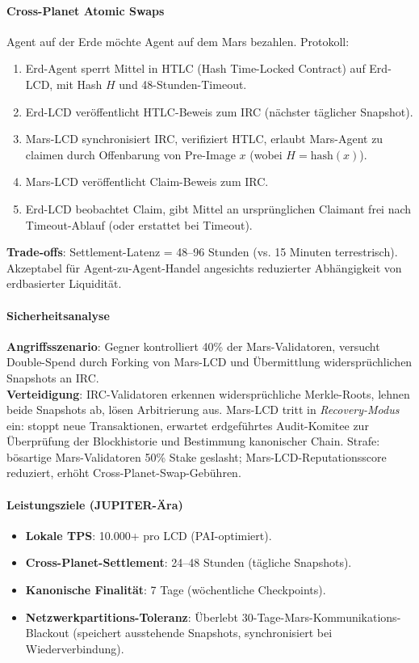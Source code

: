 \documentclass[11pt]{article}
\begin{document}
\paragraph{Cross-Planet Atomic Swaps}
Agent auf der Erde möchte Agent auf dem Mars bezahlen. Protokoll:
\begin{enumerate}[noitemsep]
  \item Erd-Agent sperrt Mittel in HTLC (Hash Time-Locked Contract) auf Erd-LCD, mit Hash $H$ und 48-Stunden-Timeout.
  \item Erd-LCD veröffentlicht HTLC-Beweis zum IRC (nächster täglicher Snapshot).
  \item Mars-LCD synchronisiert IRC, verifiziert HTLC, erlaubt Mars-Agent zu claimen durch Offenbarung von Pre-Image $x$ (wobei $H = \text{hash}(x)$).
  \item Mars-LCD veröffentlicht Claim-Beweis zum IRC.
  \item Erd-LCD beobachtet Claim, gibt Mittel an ursprünglichen Claimant frei nach Timeout-Ablauf (oder erstattet bei Timeout).
\end{enumerate}
\textbf{Trade-offs}: Settlement-Latenz = 48--96 Stunden (vs. 15 Minuten terrestrisch). Akzeptabel für Agent-zu-Agent-Handel angesichts reduzierter Abhängigkeit von erdbasierter Liquidität.

\paragraph{Sicherheitsanalyse}
\textbf{Angriffsszenario}: Gegner kontrolliert 40\% der Mars-Validatoren, versucht Double-Spend durch Forking von Mars-LCD und Übermittlung widersprüchlichen Snapshots an IRC.\\
\textbf{Verteidigung}: IRC-Validatoren erkennen widersprüchliche Merkle-Roots, lehnen beide Snapshots ab, lösen Arbitrierung aus. Mars-LCD tritt in \emph{Recovery-Modus} ein: stoppt neue Transaktionen, erwartet erdgeführtes Audit-Komitee zur Überprüfung der Blockhistorie und Bestimmung kanonischer Chain. Strafe: bösartige Mars-Validatoren 50\% Stake geslasht; Mars-LCD-Reputationsscore reduziert, erhöht Cross-Planet-Swap-Gebühren.

\paragraph{Leistungsziele (JUPITER-Ära)}
\begin{itemize}[noitemsep]
  \item \textbf{Lokale TPS}: 10.000+ pro LCD (PAI-optimiert).
  \item \textbf{Cross-Planet-Settlement}: 24--48 Stunden (tägliche Snapshots).
  \item \textbf{Kanonische Finalität}: 7 Tage (wöchentliche Checkpoints).
  \item \textbf{Netzwerkpartitions-Toleranz}: Überlebt 30-Tage-Mars-Kommunikations-Blackout (speichert ausstehende Snapshots, synchronisiert bei Wiederverbindung).
\end{itemize}
\end{document}
